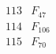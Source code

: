 \documentclass{article}
\begin{document}
{$$\begin{array}{|r|*{7}{r|}}
 & 
 & 
\\
\hline
113 
 & F_{47} &
 & 
 & 
 & 
 & 
 & 
\\
\hline
114 
 & F_{106} &
 & 
 & 
 & 
 & 
 & 
\\
\hline
115 
 & F_{70} &
 & 

\end{array}$$}
\end{document}
